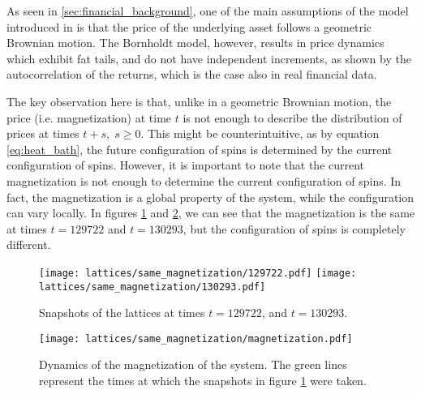As seen in \ref{sec:financial_background}, one of the main assumptions of the model introduced in \cite{black_scholes} is that the price of the underlying asset follows a geometric Brownian motion. The Bornholdt model, however, results in price dynamics which exhibit fat tails, and do not have independent increments, as shown by the autocorrelation of the returns, which is the case also in real financial data.

The key observation here is that, unlike in a geometric Brownian motion, the price (i.e. magnetization) at time $t$ is not enough to describe the distribution of prices at times $t+s, \; s\geq 0$. This might be counterintuitive, as by equation \ref{eq:heat_bath}, the future configuration of spins is determined by the current configuration of spins. However, it is important to note that the current magnetization is not enough to determine the current configuration of spins. In fact, the magnetization is a global property of the system, while the configuration can vary locally. In figures \ref{fig:lattices_m100} and \ref{fig:magnetization_m100}, we can see that the magnetization is the same at times $t=129722$ and $t=130293$, but the configuration of spins is completely different.

\begin{figure}[H]
    \centering
    \texttt{[image: lattices/same\_magnetization/129722.pdf]}
    \texttt{[image: lattices/same\_magnetization/130293.pdf]}
    \caption{Snapshots of the lattices at times $t=129722$, and $t=130293$.}
    \label{fig:lattices_m100}
\end{figure}

\begin{figure}[H]
    \centering
    \texttt{[image: lattices/same\_magnetization/magnetization.pdf]}
    \caption{Dynamics of the magnetization of the system. The green lines represent the times at which the snapshots in figure \ref{fig:lattices_m100} were taken.}
    \label{fig:magnetization_m100}
\end{figure}